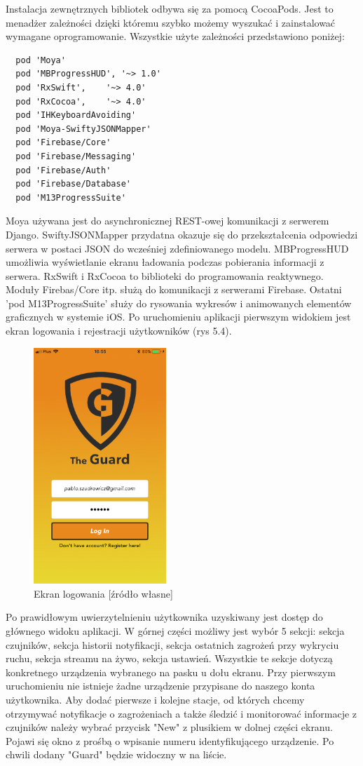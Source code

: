 Instalacja zewnętrznych bibliotek odbywa się za pomocą CocoaPods. Jest to menadżer zależności dzięki któremu szybko możemy wyszukać i zainstalować wymagane oprogramowanie. Wszystkie użyte zależności przedstawiono poniżej: 
\begin{verbatim}
  pod 'Moya'
  pod 'MBProgressHUD', '~> 1.0'
  pod 'RxSwift',    '~> 4.0'
  pod 'RxCocoa',    '~> 4.0'
  pod 'IHKeyboardAvoiding'
  pod 'Moya-SwiftyJSONMapper'
  pod 'Firebase/Core'
  pod 'Firebase/Messaging'
  pod 'Firebase/Auth'
  pod 'Firebase/Database'
  pod 'M13ProgressSuite'
\end{verbatim}
Moya używana jest do asynchronicznej REST-owej komunikacji z serwerem Django. SwiftyJSONMapper przydatna okazuje się do przekształcenia odpowiedzi serwera w postaci JSON do wcześniej zdefiniowanego modelu. MBProgressHUD umożliwia wyświetlanie ekranu ładowania podczas pobierania informacji z serwera. RxSwift i RxCocoa to biblioteki do programowania reaktywnego. Moduły Firebas/Core itp. służą do komunikacji z serwerami Firebase. Ostatni 'pod M13ProgressSuite' służy do rysowania wykresów i animowanych elementów graficznych w systemie iOS.
Po uruchomieniu aplikacji pierwszym widokiem jest ekran logowania i rejestracji użytkowników (rys 5.4). 
\begin{figure}[ht]
	\centering
	\includegraphics[width=5cm]{ios_screenshots/login.png}
	\caption{Ekran logowania [źródło własne]}
\end{figure}
Po prawidłowym uwierzytelnieniu użytkownika uzyskiwany jest dostęp do głównego widoku aplikacji. W górnej części możliwy jest wybór 5 sekcji:
sekcja czujników, sekcja historii notyfikacji, sekcja ostatnich zagrożeń przy wykryciu ruchu, sekcja streamu na żywo, sekcja ustawień. Wszystkie te sekcje dotyczą konkretnego urządzenia wybranego na pasku u dołu ekranu. Przy pierwszym uruchomieniu nie istnieje żadne urządzenie przypisane do naszego konta użytkownika. Aby dodać pierwsze i kolejne stacje, od których chcemy otrzymywać notyfikacje o zagrożeniach a także śledzić i monitorować informacje z czujników należy wybrać przycisk "New" z plusikiem w dolnej części ekranu. Pojawi się okno z prośbą o wpisanie numeru identyfikującego urządzenie. Po chwili dodany "Guard" będzie widoczny w na liście.
